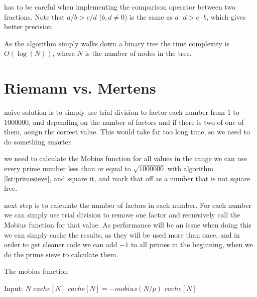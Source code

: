 \documentclass[11pt,a4paper,twoside]{article}
\begin{document}
 has to be careful when implementing the comparison operator
between two fractions.  Note that $a/b > c/d$ ($b,d \neq 0$) is the same as $a
\cdot d > c \cdot b$, which gives better precision.

As the algorithm simply walks down a binary tree the time complexity is
$O(\log(N))$, where $N$ is the number of nodes in the tree.



\section{Riemann vs. Mertens}

 naive solution is to simply use trial division to factor each
number from $1$ to $1000000$, and depending on the number of factors and if
there is two of one of them, assign the correct value. This would take far too
long time, so we need to do something smarter.

 we need to calculate the Mobius function for all values in the
range we can use every prime number less than or equal to $\sqrt{1000000}$ with
algorithm \ref{lst:primesieve}, and square it, and mark that off as a number
that is not square free.

 next step is to calculate the number of factors in each number.
For each number we can simply use trial division to remove one factor and
recursively call the Mobius function for that value. As performance will be an
issue when doing this we can simply cache the results, as they will be used
more than once, and in order to get cleaner code we can add $-1$ to all primes
in the beginning, when we do the prime sieve to calculate them.

\begin{algorithm}
    \label{mobius}
    \caption{The mobius function}
    \begin{algorithmic}
        \REQUIRE Input: $N$
            \RETURN $cache[N]$
        \ENDIF
                \STATE $cache[N] = - mobius(N/p)$
                \RETURN $cache[N]$
            \ENDIF
        \ENDFOR
    \end{algorithmic}
\end{algorithm}
\end{document}
